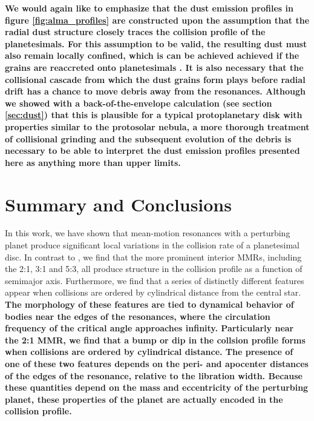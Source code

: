 \documentclass[fleqn,usenatbib]{mnras}
\begin{document}
\textbf{We would again like to emphasize that the dust emission profiles in figure \ref{fig:alma_profiles} are constructed upon the assumption that the radial dust structure closely traces the collision profile of the planetesimals. For this assumption to be valid, the resulting dust must also remain locally confined, which is can be achieved achieved if the grains are reaccreted onto planetesimals \citep{2015SciA....1E0109J}. It is also necessary that the collisional cascade from which the dust grains form plays before radial drift has a chance to move debris away from the resonances. Although we showed with a back-of-the-envelope calculation (see section \ref{sec:dust}) that this is plausible for a typical protoplanetary disk with properties similar to the protosolar nebula, a more thorough treatment of collisional grinding and the subsequent evolution of the debris is necessary to be able to interpret the dust emission profiles presented here as anything more than upper limits.}

\section{Summary and Conclusions}\label{sec:conclusions}

In this work, we have shown that mean-motion resonances with a perturbing planet produce significant local variations in the collision rate of a 
planetesimal disc. In contrast to \citet{2000Icar..143...45R}, we find that the more prominent interior MMRs, including the 2:1, 3:1 and 5:3, all 
produce structure in the collision profile as a function of semimajor axis. Furthermore, we find that a series of distinctly different features appear 
when collisions are ordered by cylindrical distance from the central star. \textbf{The morphology of these features are tied to dynamical behavior of bodies near the edges of the resonances, where the circulation frequency of the critical angle approaches infinity. Particularly near the 2:1 MMR, we find that a bump or dip in the collsion profile forms when collisions are ordered by cylindrical distance. The presence of one of these two features depends on the peri- and apocenter distances of the edges of the resonance, relative to the libration width. Because these quantities depend on the mass and eccentricity of the perturbing planet, these properties of the planet are actually encoded in the collision profile.}
\end{document}

